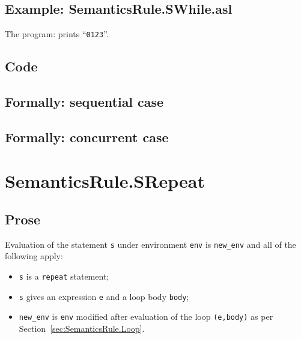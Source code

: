 \documentclass{book}
\begin{document}
    \subsection{Example: SemanticsRule.SWhile.asl}
    The program:
    prints ``\texttt{0123}''.

  \subsection{Code}

\begin{emptyformal}
  \subsection{Formally: sequential case}

  \subsection{Formally: concurrent case}
\end{emptyformal}


\section{SemanticsRule.SRepeat \label{sec:SemanticsRule.SRepeat}}

    \subsection{Prose}
  Evaluation of the statement \texttt{s} under environment \texttt{env} is
\texttt{new\_env} and all of the following apply:
    \begin{itemize}
    \item \texttt{s} is a \texttt{repeat} statement;
    \item \texttt{s} gives an expression \texttt{e} and a loop body \texttt{body};
    \item \texttt{new\_env} is \texttt{env} modified after evaluation of the loop \texttt{(e,body)} as per Section~\ref{sec:SemanticsRule.Loop}.
    \end{itemize}
\end{document}
